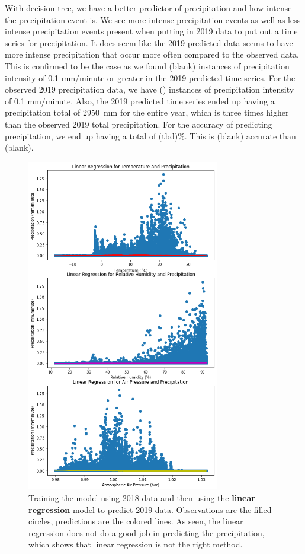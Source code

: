\documentclass[11pt]{report}
\begin{document}
With decision tree, we have a better predictor of precipitation and how intense the precipitation event is. We see more intense precipitation events as well as less intense precipitation events present when putting in 2019 data to put out a time series for precipitation. It does seem like the 2019 predicted data seems to have more intense precipitation that occur more often compared to the observed data. This is confirmed to be the case as we found (blank) instances of precipitation intensity of 0.1 mm/minute or greater in the 2019 predicted time series. For the observed 2019 precipitation data, we have () instances of precipitation intensity of 0.1 mm/minute. Also, the 2019 predicted time series ended up having a precipitation total of 2950~mm for the entire year, which is three times higher than the observed 2019 total precipitation. For the accuracy of predicting precipitation, we end up having a total of (tbd)\%. This is (blank) accurate than (blank).    
\begin{figure}[t]
  \centering
  \includegraphics[width=0.75\textwidth]{Figures/ML_Linear_reg.png}
  \caption[ML linear regression run] {\label{ML_Linear}Training the model
    using 2018 data and then using the \textbf{linear regression} model to
    predict 2019 data. Observations are the filled circles, predictions are
    the colored lines. As seen, the linear regression does not do a good job
    in predicting the precipitation, which shows that linear regression is
    not the right method. }
\end{figure}
\end{document}
